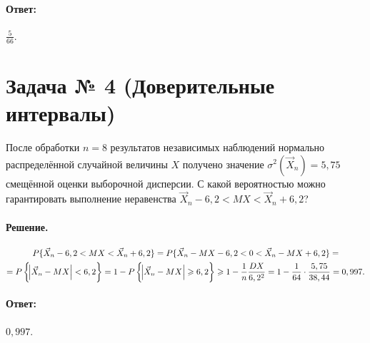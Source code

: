 \documentclass[a4paper,oneside,12pt]{extreport}
\begin{document}
\paragraph{Ответ:} $\displaystyle \frac 5{66}$.

\pagebreak
\section*{Задача № 4 (Доверительные интервалы)}

После обработки $n = 8$ результатов независимых наблюдений нормально распределённой случайной величины $X$ получено значение $\sigma^2(\vec X_n) = 5,75$ смещённой оценки выборочной дисперсии.
С какой вероятностью можно гарантировать выполнение неравенства $\vec X_n - 6,2 < MX < \vec X_n + 6,2$?

\paragraph{Решение.}
\begin{multline*}
	P\{\vec X_n - 6,2 < MX < \vec X_n + 6,2\} = P\{\vec X_n - MX - 6,2 < 0 < \vec X_n - MX + 6,2\} = \\
	= P\left\{\abs{\vec X_n - MX} < 6,2\right\} = 1 -P\left\{\abs{\vec X_n - MX} \geqslant 6,2\right\} \geqslant 1 - \frac1n\frac{DX}{6,2^2} = 1 - \frac1{64}\cdot\frac{5,75}{38,44} = 0,997.
\end{multline*}

\paragraph{Ответ:} $0,997$.
\end{document}
